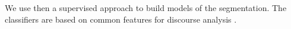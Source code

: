%

We use then a supervised approach to build models of the segmentation. The classifiers are based on common features for discourse analysis \cite{joty:2013:acl}.



